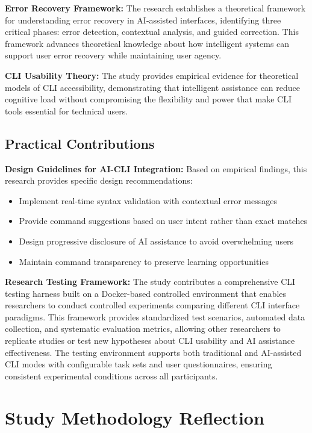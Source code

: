 \textbf{Error Recovery Framework:}
The research establishes a theoretical framework for understanding error recovery in AI-assisted interfaces, identifying three critical phases: error detection, contextual analysis, and guided correction. This framework advances theoretical knowledge about how intelligent systems can support user error recovery while maintaining user agency.

\textbf{CLI Usability Theory:}
The study provides empirical evidence for theoretical models of CLI accessibility, demonstrating that intelligent assistance can reduce cognitive load without compromising the flexibility and power that make CLI tools essential for technical users.

\subsection{Practical Contributions}

\textbf{Design Guidelines for AI-CLI Integration:}
Based on empirical findings, this research provides specific design recommendations:
\begin{itemize}
	\item Implement real-time syntax validation with contextual error messages
	\item Provide command suggestions based on user intent rather than exact matches
	\item Design progressive disclosure of AI assistance to avoid overwhelming users
	\item Maintain command transparency to preserve learning opportunities
\end{itemize}

\textbf{Research Testing Framework:}
The study contributes a comprehensive CLI testing harness built on a Docker-based controlled environment that enables researchers to conduct controlled experiments comparing different CLI interface paradigms. This framework provides standardized test scenarios, automated data collection, and systematic evaluation metrics, allowing other researchers to replicate studies or test new hypotheses about CLI usability and AI assistance effectiveness. The testing environment supports both traditional and AI-assisted CLI modes with configurable task sets and user questionnaires, ensuring consistent experimental conditions across all participants.

\section{Study Methodology Reflection}


